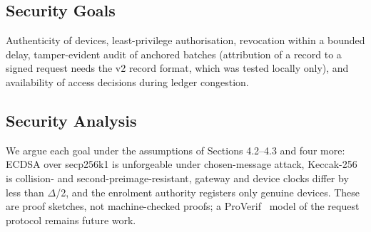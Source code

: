 \documentclass[a4paper,5p,times,twocolumn,number,sort&compress]{elsarticle}
\begin{document}
\subsection{Security Goals}

Authenticity of devices, least-privilege authorisation, revocation within a bounded delay, tamper-evident audit of anchored batches (attribution of a record to a signed request needs the v2 record format, which was tested locally only), and availability of access decisions during ledger congestion.

\subsection{Security Analysis}

We argue each goal under the assumptions of Sections 4.2--4.3 and four more: ECDSA over secp256k1 is unforgeable under chosen-message attack, Keccak-256 is collision- and second-preimage-resistant, gateway and device clocks differ by less than $\Delta$/2, and the enrolment authority registers only genuine devices. These are proof sketches, not machine-checked proofs; a ProVerif~\cite{blanchet} model of the request protocol remains future work.
\end{document}

